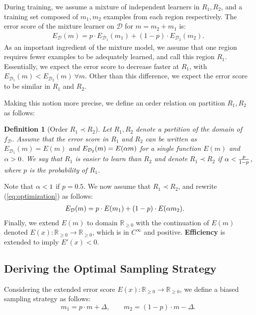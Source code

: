 \documentclass{article}
\newcommand{\R}{\mathbb{R}}
\newcommand{\Dd}{\mathcal{D}}
\newcommand{\pR}{1}\newcommand{\rR}{2}\newcommand{\prR}{i}
\newcommand{\qDel}{\Delta}
\newcommand{\psn}{\R_{\ge 0}}
\newtheorem{defn}{Definition}
\begin{document}
During training, we assume a mixture of independent learners in $R_\pR,R_\rR$, and a training set composed of $m_\pR,m_\rR$ examples from each region respectively. The error score of the mixture learner on $\Dd$ for $m=m_\rR+m_\pR$ is:
\begin{equation}
\begin{split}
\label{eq:optimization}
    E_{\Dd}(m) = p\cdot E_{\Dd_\pR}(m_\pR) + (1-p)\cdot E_{\Dd_\rR}(m_\rR).
\end{split}
\end{equation}
As an important ingredient of the mixture model, we assume that one region requires fewer examples to be adequately learned, and call this region $R_\pR$. Essentially, we expect the error score to decrease faster at $R_\pR$, with $E_{\Dd_\pR}(m)<E_{\Dd_\rR}(m)~\forall m$. Other than this difference, we expect the error score to be similar in $R_\pR$ and $R_\rR$. 

Making this notion more precise, we define an order relation on partition $R_\pR, R_\rR$ as follows:
\begin{defn}[Order $R_\pR\prec R_\rR$] 
Let $R_\pR, R_\rR$ denote a partition of the domain of $f_\Dd$. Assume that the error score in $R_\pR$ and $R_\rR$ can be written as $E_{\Dd_\pR}(m) =E(m)$ and $E_{\Dd_\rR}(m)= E(\qhard m)$ for a single function $E(m)$ and $\alpha>0$. We say that $R_\pR$ is easier to learn than $R_\rR$ and denote {$R_\pR\prec R_\rR$} if $\alpha<\frac{p}{1-p}$, where $p$ is the probability of $R_\pR$.
\label{def:ease}
\end{defn} 
Note that $\alpha < 1$ if $p=0.5$. We now assume that $R_\pR\prec R_\rR$, and rewrite (\ref{eq:optimization}) as follows:
\begin{equation}
\begin{split}
\label{eq:Etotal}
E_\Dd(m)&= p \cdot E(m_\pR) + (1-p) \cdot E(\qhard m_\rR).
\end{split}
\end{equation}
Finally, we extend $E(m)$ to domain $\psn$ with the continuation of $E(m)$ denoted $E(x):\psn\rightarrow\psn$, which is in $C^\infty$ and positive. \textbf{Efficiency} is extended to imply $E'(x)<0$. 
\subsection{Deriving the Optimal Sampling Strategy}
\label{sec:biased}


Considering the extended error score $E(x):\psn\rightarrow\psn$, we define a biased sampling strategy as follows:
\begin{equation*}
\label{eq:m}
m_\pR =p\cdot m+\qDel, \qquad m_\rR =\left(1-p\right)\cdot m-\qDel.
\end{equation*}
\end{document}
